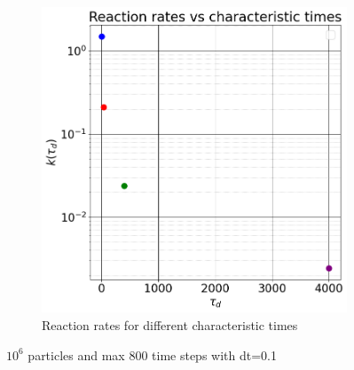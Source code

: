 \documentclass{article}
\begin{document}
\begin{figure}[htbp]
\begin{subfigure}[b]{0.48\textwidth}
        \includegraphics[width=\textwidth]{images/reactionVsTau.png}
        \caption{Reaction rates for different characteristic times}
    \end{subfigure}
    \caption{$10^6$ particles and max 800 time steps with dt=0.1}
    \label{fig:reactionRatesTau}
\end{figure}

\FloatBarrier  %
\end{document}
